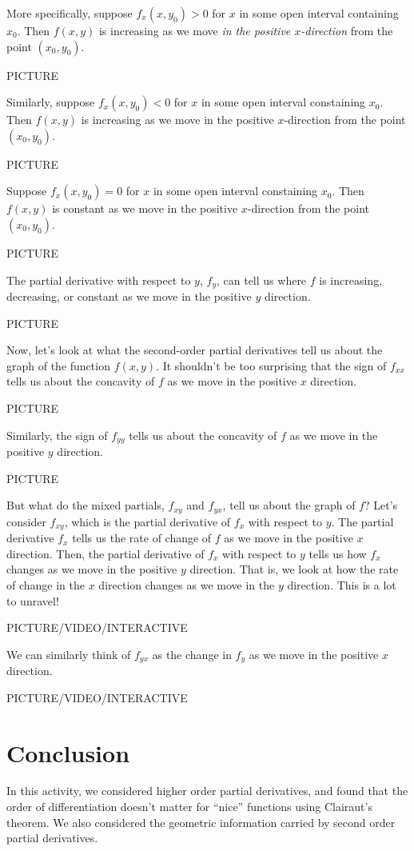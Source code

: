 \documentclass{ximera}
\begin{document}
More specifically, suppose $f_x(x,y_0)>0$ for $x$ in some open interval containing $x_0$. Then $f(x,y)$ is increasing as we move \emph{in the positive $x$-direction} from the point $(x_0,y_0)$.

PICTURE

Similarly, suppose $f_x(x,y_0)<0$ for $x$ in some open interval constaining $x_0$. Then $f(x,y)$ is increasing as we move in the positive $x$-direction from the point $(x_0,y_0)$.

PICTURE

Suppose $f_x(x,y_0)=0$ for $x$ in some open interval constaining $x_0$. Then $f(x,y)$ is constant as we move in the positive $x$-direction from the point $(x_0,y_0)$.

PICTURE

The partial derivative with respect to $y$, $f_y$, can tell us where $f$ is increasing, decreasing, or constant as we move in the positive $y$ direction.

PICTURE

Now, let's look at what the second-order partial derivatives tell us about the graph of the function $f(x,y)$. It shouldn't be too surprising that the sign of $f_{xx}$ tells us about the concavity of $f$ as we move in the positive $x$ direction.

PICTURE

Similarly, the sign of $f_{yy}$ tells us about the concavity of $f$ as we move in the positive $y$ direction.

PICTURE

But what do the mixed partials, $f_{xy}$ and $f_{yx}$, tell us about the graph of $f$? Let's consider $f_{xy}$, which is the partial derivative of $f_x$ with respect to $y$. The partial derivative $f_x$ tells us the rate of change of $f$ as we move in the positive $x$ direction. Then, the partial derivative of $f_x$ with respect to $y$ tells us how $f_x$ changes as we move in the positive $y$ direction. That is, we look at how the rate of change in the $x$ direction changes as we move in the $y$ direction. This is a lot to unravel!

PICTURE/VIDEO/INTERACTIVE

We can similarly think of $f_{yx}$ as the change in $f_y$ as we move in the positive $x$ direction.

PICTURE/VIDEO/INTERACTIVE

\section{Conclusion}

In this activity, we considered higher order partial derivatives, and found that the order of differentiation doesn't matter for ``nice'' functions using Clairaut's theorem. We also considered the geometric information carried by second order partial derivatives.
\end{document}
